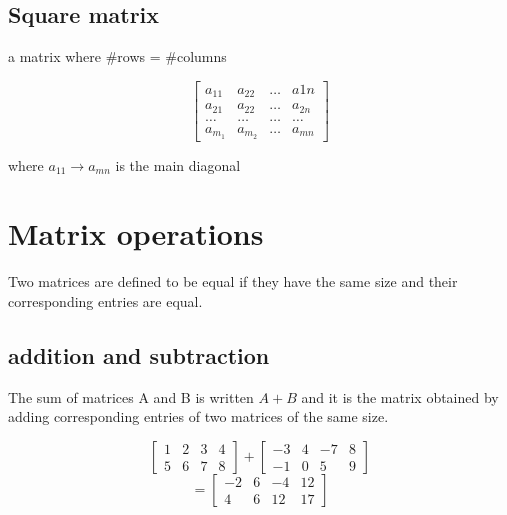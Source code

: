 \subsection{Square matrix}%
\label{sub:square_matrix}

\begin{definition}
	a matrix where \#rows = \#columns

	\[\begin{bmatrix} a_{11} & a_{22} & \ldots &a 1n \\
	a_{21} & a_{22} & \ldots & a_{2n} \\
\ldots & \ldots & \ldots & \ldots \\
a_{m_1} & a_{m_2} & \ldots & a_{mn}\end{bmatrix} \]

where $a_{11} \to a_{mn}$ is the main diagonal
\end{definition}

\section{Matrix operations}%
\label{sec:matrix_operations}


\begin{theorem}
	Two matrices are defined to be equal if they have the same size and their corresponding entries are equal.
\end{theorem}

\subsection{addition and subtraction}%
\label{sub:addition_and_subtraction}

\begin{theorem}[]
The sum of matrices A and B is written $A + B$ and it is the matrix obtained by adding corresponding
entries of two matrices of the same size.
\end{theorem}

\begin{example}

	\[\begin{bmatrix} 1& 2 & 3&4 \\5&6&7&8 \end{bmatrix} + \begin{bmatrix} -3&4&-7&8 \\ -1& 0 & 5 & 9 \end{bmatrix}  \]
	\[= \begin{bmatrix}  -2 & 6 & -4 & 12 \\ 4 & 6 & 12 & 17 \end{bmatrix} \]
\end{example}

